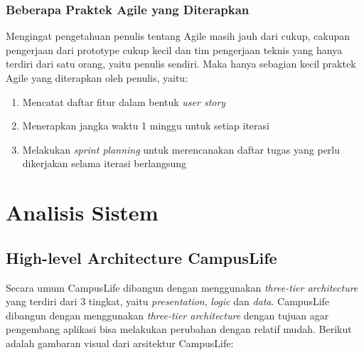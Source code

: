 \documentclass[a4paper, 12pt]{report}
\begin{document}
\subsection{Beberapa Praktek Agile yang Diterapkan}

\onehalfspacing Mengingat pengetahuan penulis tentang Agile masih jauh dari cukup, cakupan pengerjaan dari prototype cukup kecil dan tim pengerjaan teknis yang hanya terdiri dari satu orang, yaitu penulis sendiri. Maka hanya sebagian kecil praktek Agile yang diterapkan oleh penulis, yaitu:

\begin{enumerate}
  \item Mencatat daftar fitur dalam bentuk \textit{user story}
  \item Menerapkan jangka waktu 1 minggu untuk setiap iterasi
  \item Melakukan \textit{sprint planning} untuk merencanakan daftar tugas yang perlu dikerjakan selama iterasi berlangsung
\end{enumerate}

\chapter{Analisis Sistem}
\section{High-level Architecture CampusLife}
\onehalfspacing Secara umum CampusLife dibangun dengan menggunakan \textit{three-tier architecture} yang terdiri dari 3 tingkat, yaitu \textit{presentation}, \textit{logic} dan \textit{data}. CampusLife dibangun dengan menggunakan \textit{three-tier architecture} dengan tujuan agar pengembang aplikasi bisa melakukan perubahan dengan relatif mudah. Berikut adalah gambaran visual dari arsitektur CampusLife:
\end{document}
